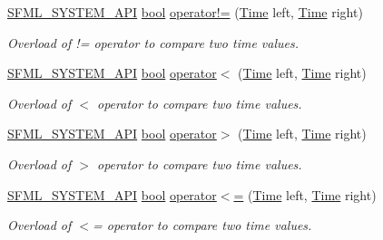 \begin{DoxyCompactItemize}
\hyperlink{sfml_2dep_2_s_f_m_l-2_84_82_2include_2_s_f_m_l_2_system_2_export_8hpp_a6476c9e422606477a4c23d92b1d79a1f}{S\-F\-M\-L\-\_\-\-S\-Y\-S\-T\-E\-M\-\_\-\-A\-P\-I} \hyperlink{term__entry_8h_a002004ba5d663f149f6c38064926abac}{bool} \hyperlink{classsf_1_1_time_ae06b561f6422ec8ca414d400efd2cf4b}{operator!=} (\hyperlink{classsf_1_1_time}{Time} left, \hyperlink{classsf_1_1_time}{Time} right)
\begin{DoxyCompactList}\small\item\em Overload of != operator to compare two time values. \end{DoxyCompactList}\item 
\hyperlink{sfml_2dep_2_s_f_m_l-2_84_82_2include_2_s_f_m_l_2_system_2_export_8hpp_a6476c9e422606477a4c23d92b1d79a1f}{S\-F\-M\-L\-\_\-\-S\-Y\-S\-T\-E\-M\-\_\-\-A\-P\-I} \hyperlink{term__entry_8h_a002004ba5d663f149f6c38064926abac}{bool} \hyperlink{classsf_1_1_time_ac222933174ddcff5d14c3ac7d1020d54}{operator$<$} (\hyperlink{classsf_1_1_time}{Time} left, \hyperlink{classsf_1_1_time}{Time} right)
\begin{DoxyCompactList}\small\item\em Overload of $<$ operator to compare two time values. \end{DoxyCompactList}\item 
\hyperlink{sfml_2dep_2_s_f_m_l-2_84_82_2include_2_s_f_m_l_2_system_2_export_8hpp_a6476c9e422606477a4c23d92b1d79a1f}{S\-F\-M\-L\-\_\-\-S\-Y\-S\-T\-E\-M\-\_\-\-A\-P\-I} \hyperlink{term__entry_8h_a002004ba5d663f149f6c38064926abac}{bool} \hyperlink{classsf_1_1_time_a23978402846bf3c7ac54a3f2c6b397a2}{operator$>$} (\hyperlink{classsf_1_1_time}{Time} left, \hyperlink{classsf_1_1_time}{Time} right)
\begin{DoxyCompactList}\small\item\em Overload of $>$ operator to compare two time values. \end{DoxyCompactList}\item 
\hyperlink{sfml_2dep_2_s_f_m_l-2_84_82_2include_2_s_f_m_l_2_system_2_export_8hpp_a6476c9e422606477a4c23d92b1d79a1f}{S\-F\-M\-L\-\_\-\-S\-Y\-S\-T\-E\-M\-\_\-\-A\-P\-I} \hyperlink{term__entry_8h_a002004ba5d663f149f6c38064926abac}{bool} \hyperlink{classsf_1_1_time_a2c22369869bf903578635bc6517c44d4}{operator$<$=} (\hyperlink{classsf_1_1_time}{Time} left, \hyperlink{classsf_1_1_time}{Time} right)
\begin{DoxyCompactList}\small\item\em Overload of $<$= operator to compare two time values. \end{DoxyCompactList}\item 

\end{DoxyCompactItemize}
